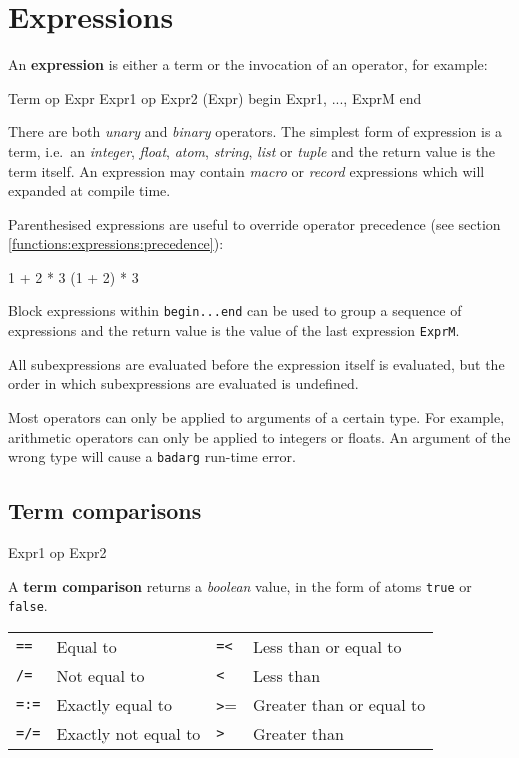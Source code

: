 \section{Expressions}
\label{functions:expressions}
An \textbf{expression} is either a term or the invocation of an
operator, for example:

\begin{erlang}
Term
op Expr
Expr1 op Expr2
(Expr)
begin
   Expr1,
   ...,
   ExprM            %
end

\end{erlang}

There are both \textit{unary} and \textit{binary} operators. The
simplest form of expression is a term, i.e.~an \textit{integer},
\textit{float}, \textit{atom}, \textit{string}, \textit{list} or
\textit{tuple} and the return value is the term itself. An expression
may contain \textit{macro} or \textit{record} expressions which will
expanded at compile time.

Parenthesised expressions are useful to override operator precedence (see section \ref{functions:expressions:precedence}):

\begin{erlang}
1 + 2 * 3           %
(1 + 2) * 3         %
\end{erlang}

Block expressions within \texttt{begin...end} can be used to group a
sequence of expressions and the return value is the value of the last
expression \texttt{ExprM}.

All subexpressions are evaluated before the expression itself is
evaluated, but the order in which subexpressions are evaluated is undefined.

Most operators can only be applied to arguments of a certain type. For
example, arithmetic operators can only be applied to integers or
floats. An argument of the wrong type will cause a \texttt{badarg}
run-time error.


\subsection{Term comparisons}
\begin{erlang}
Expr1 op Expr2
\end{erlang}

A \textbf{term comparison} returns a \textit{boolean} value,
in the form of atoms \texttt{true} or \texttt{false}.

\begin{center}
\begin{tabular}{|>{\raggedright}p{40pt}|>{\raggedright}p{105pt}|>{\raggedright}p{26pt}|>{\raggedright}p{124pt}|}
\hline
\multicolumn{4}{|p{297pt}|}{Comparison operators}\tabularnewline
\hline
\texttt{==} & Equal to & \texttt{=<} & Less than or equal to\tabularnewline
\hline
\texttt{/=} & Not equal to & \texttt{<} & Less than\tabularnewline
\hline
\texttt{=:=} & Exactly equal to & \texttt{>}= & Greater than or equal to\tabularnewline
\hline
\texttt{=/=} & Exactly not equal to & \texttt{>} & Greater than\tabularnewline
\hline
\end{tabular}
\end{center}

